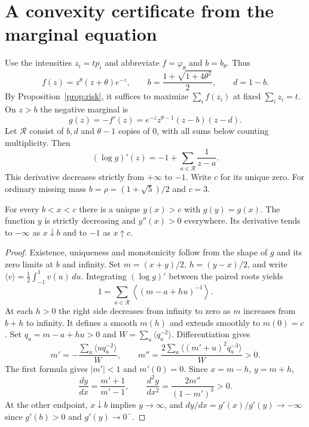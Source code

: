 \section{A convexity certificate from the marginal equation}
Use the intensities $z_i=tp_i$ and abbreviate $f=\varphi_\theta$ and $b=b_\theta$. Thus
\[
 f(z)=z^\theta(z+\theta)e^{-z},\qquad
 b=\frac{1+\sqrt{1+4\theta^2}}2,\qquad d=1-b.
\]
By Proposition~\ref{prop:risk}, it suffices to maximize $\sum_i f(z_i)$ at fixed
$\sum_i z_i=t$. On $z>b$ the negative marginal is
\[
 g(z)=-f'(z)=e^{-z}z^{\theta-1}(z-b)(z-d).
\]
Let $\mathcal R$ consist of $b,d$ and $\theta-1$ copies of $0$, with all
sums below counting multiplicity. Then
\[
 (\log g)'(z)=-1+\sum_{a\in\mathcal R}\frac1{z-a}.
\]
This derivative decreases strictly from $+\infty$ to $-1$. Write $c$ for
its unique zero. For ordinary missing mass $b=\rho=(1+\sqrt5)/2$ and $c=3$.

\begin{lemma}\label{gtp:pair}
For every $b<x<c$ there is a unique $y(x)>c$ with $g(y)=g(x)$.
The function $y$ is strictly decreasing and $y''(x)>0$ everywhere.
Its derivative tends to $-\infty$ as $x\downarrow b$ and to $-1$ as
$x\uparrow c$.
\end{lemma}
\begin{proof}
Existence, uniqueness and monotonicity follow from the shape of $g$ and its
zero limits at $b$ and infinity. Set $m=(x+y)/2$, $h=(y-x)/2$, and write
$\langle v\rangle=\frac12\int_{-1}^1v(u)\,du$. Integrating
$(\log g)'$ between the paired roots yields
\begin{equation}\label{gtp:average}
  1=\sum_{a\in\mathcal R}\left\langle (m-a+hu)^{-1}\right\rangle .
\end{equation}
At each $h>0$ the right side decreases from infinity to zero as $m$
increases from $b+h$ to infinity. It defines a smooth $m(h)$ and extends
smoothly to $m(0)=c$. Set $q_a=m-a+hu>0$ and
$W=\sum_a\langle q_a^{-2}\rangle$. Differentiation gives
\begin{equation}\label{gtp:certificate}
 m'=-\frac{\sum_a\langle u q_a^{-2}\rangle}{W},\qquad
 m''=\frac{2\sum_a\langle (m'+u)^2 q_a^{-3}\rangle}{W}>0 .
\end{equation}
The first formula gives $|m'|<1$ and $m'(0)=0$. Since
$x=m-h$, $y=m+h$,
\[
 \frac{dy}{dx}=\frac{m'+1}{m'-1},\qquad
 \frac{d^2y}{dx^2}=\frac{2m''}{(1-m')^3}>0 .
\]
At the other endpoint, $x\downarrow b$ implies $y\to\infty$, and
$dy/dx=g'(x)/g'(y)\to-\infty$ since $g'(b)>0$ and $g'(y)\to0^-$.
\end{proof}

